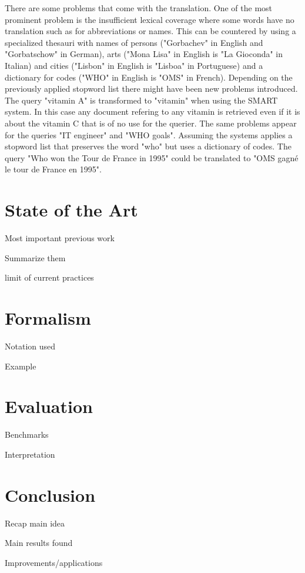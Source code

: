 \documentclass[journal]{IEEEtran}
\begin{document}
There are some problems that come with the translation. One of the most prominent problem is the insufficient lexical coverage where some words have no translation such as for abbreviations or names. This can be countered by using a specialized thesauri with names of persons ("Gorbachev" in English and "Gorbatschow" in German), arts ("Mona Lisa" in English is "La Gioconda" in Italian) and cities ("Lisbon" in English is "Lisboa" in Portuguese) and a dictionary for codes ("WHO" in English is "OMS" in French).
Depending on the previously applied stopword list there might have been new problems introduced. The query "vitamin A" is transformed to "vitamin" when using the SMART system. In this case any document refering to any vitamin is retrieved even if it is about the vitamin C that is of no use for the querier. The same problems appear for the queries "IT engineer" and "WHO goals".
Assuming the systems applies a stopword list that preserves the word "who" but uses a dictionary of codes. The query "Who won the Tour de France in 1995" could be translated to "OMS gagné le tour de France en 1995".

\section{State of the Art}

Most important previous work

Summarize them

limit of current practices



\section{Formalism}
Notation used

Example



\section{Evaluation}
Benchmarks

Interpretation



\section{Conclusion}
Recap main idea

Main results found

Improvements/applications

\cite{gollins01}
\cite{peters12}
\cite{savoy09}
\cite{yu09}



\end{document}
